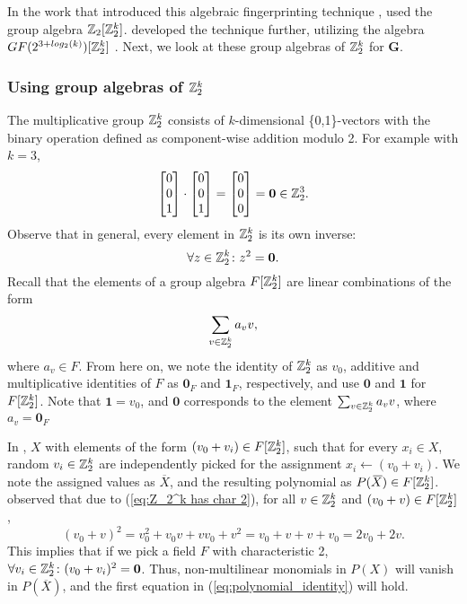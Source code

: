 In the work that introduced 
this algebraic fingerprinting technique \cite{Koutis08}, 
\citeauthor{Koutis08} used the group algebra $\mathbb Z_2[\mathbb Z_2^k]$. 
\citeauthor{Williams09} developed the technique further, 
utilizing the algebra $GF(2^{3+log_2(k)})[\mathbb Z_2^k]$ \cite{Williams09}. 
Next, we look at these 
group algebras of $\mathbb Z_2^k$ for $\mathbf{G}$. 

\subsubsection{Using group algebras of $\mathbb Z_2^k$}

The multiplicative group $\mathbb Z_2^k$ consists of $k$-dimensional \{0,1\}-vectors 
with the binary operation defined as component-wise addition modulo 2. 
For example with $k = 3$, 
\[
  \begin{bmatrix} 0 \\ 0 \\ 1 \end{bmatrix} \cdot 
  \begin{bmatrix} 0 \\ 0 \\ 1 \end{bmatrix} =
  \begin{bmatrix} 0 \\ 0 \\ 0 \end{bmatrix} = \mathbf{0} \in \mathbb Z_2^3.
\]
Observe that in general, every element in $\mathbb Z_2^k$ is its own inverse:
\begin{equation}
  \label{eq:Z_2^k has char 2}
  \forall z \in \mathbb Z_2^k \colon z^2 = \mathbf{0}.
\end{equation}
Recall that the elements of a group algebra $F[\mathbb Z_2^k]$ are linear combinations of the form 
\[
  \displaystyle \sum_{v \in \mathbb Z_2^k}a_v v,
\]
where $a_v \in F$. From here on, we note the identity of $\mathbb Z_2^k$ as $v_0$, additive and 
multiplicative identities of $F$ as $\mathbf{0}_F$ and $\mathbf{1}_F$, respectively, and 
use $\mathbf{0}$ and $\mathbf{1}$ for $F[\mathbb Z_2^k]$. Note that $\mathbf{1} = v_0$, and
$\mathbf{0}$ corresponds to the element $\sum_{v \in \mathbb Z_2^k}a_v v$, where $a_v = \mathbf{0}_F$

In \cite{Koutis08}, \citeauthor{Koutis08}  $X$ 
with elements of the form $(v_0 + v_i) \in F[\mathbb Z_2^k]$, 
such that for every $x_i \in X$, random $v_i \in \mathbb Z_2^k$ are independently picked for the assignment 
$x_i \leftarrow (v_0 + v_i)$. 
We note the assigned values as $\overbar{X}$, and the resulting polynomial as $P(\,\overline{\!{X}}) \in F[\mathbb Z_2^k]$. 
\citeauthor{Koutis08} observed that 
due to (\ref{eq:Z_2^k has char 2}), for all $v \in \mathbb Z_2^k$ and $(v_0 + v) \in F[\mathbb Z_2^k]$, 
\[
  (v_0 + v)^2 = v_0^2 + v_0v + vv_0 + v^2 = v_0 + v + v + v_0 = 2v_0 + 2v.
\]
This implies that if we pick a field $F$ with characteristic 2, 
$\forall v_i \in \mathbb Z_2^k \colon (v_0 + v_i)^2 = \mathbf{0}$. Thus, 
non-multilinear monomials in $P(X)$ will vanish in $P(\overbar{X})$, and the 
first equation in (\ref{eq:polynomial_identity}) 
will hold.

